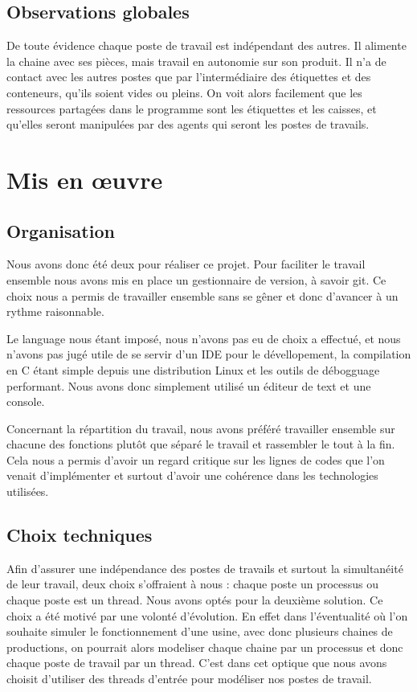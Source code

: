 \documentclass[11pt]{report}
\begin{document}
	\section{Observations globales}
		De toute évidence chaque poste de travail est indépendant des autres. Il alimente la chaine avec ses pièces, mais travail en autonomie sur son produit. Il n'a de contact avec les autres postes que par l'intermédiaire des étiquettes et des conteneurs, qu'ils soient vides ou pleins. On voit alors facilement que les ressources partagées dans le programme sont les étiquettes et les caisses, et qu'elles seront manipulées par des agents qui seront les postes de travails. 
	
		
\chapter{Mis en \oe{}uvre}

	\section{Organisation}
	Nous avons donc été deux pour réaliser ce projet. Pour faciliter le travail ensemble nous avons mis en place un gestionnaire de version, à savoir git. Ce choix nous a permis de travailler ensemble sans se gêner et donc d'avancer à un rythme raisonnable. 
	
	Le language nous étant imposé, nous n'avons pas eu de choix a effectué, et nous n'avons pas jugé utile de se servir d'un IDE pour le dévellopement, la compilation en C étant simple depuis une distribution Linux et les outils de débogguage performant. Nous avons donc simplement utilisé un éditeur de text et une console. 
	
	Concernant la répartition du travail, nous avons préféré travailler ensemble sur chacune des fonctions plutôt que séparé le travail et rassembler le tout à la fin. Cela nous a permis d'avoir un regard critique sur les lignes de codes que l'on venait d'implémenter et surtout d'avoir une cohérence dans les technologies utilisées. 
	\section{Choix techniques}
	Afin d'assurer une indépendance des postes de travails et surtout la simultanéité de leur travail, deux choix s'offraient à nous : chaque poste un processus ou chaque poste est un thread. Nous avons optés pour la deuxième solution. Ce choix a été motivé par une volonté d'évolution. En effet dans l'éventualité où l'on souhaite simuler le fonctionnement d'une usine, avec donc plusieurs chaines de productions, on pourrait alors modeliser chaque chaine par un processus et donc chaque poste de travail par un thread. C'est dans cet optique que nous avons choisit d'utiliser des threads d'entrée pour modéliser nos postes de travail.
	
\end{document}
